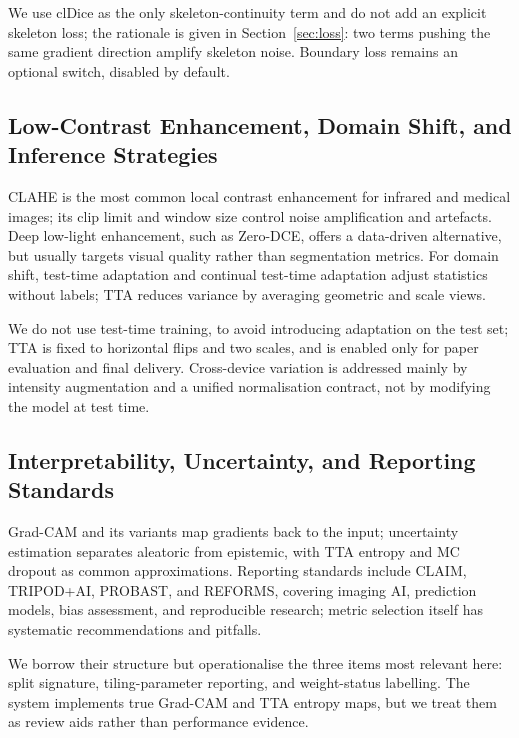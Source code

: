 We use clDice as the only skeleton-continuity term and do not add an explicit skeleton loss; the rationale is given in Section~\ref{sec:loss}: two terms pushing the same gradient direction amplify skeleton noise. Boundary loss remains an optional switch, disabled by default.

\subsection{Low-Contrast Enhancement, Domain Shift, and Inference Strategies}

CLAHE is the most common local contrast enhancement for infrared and medical images; its clip limit and window size control noise amplification and artefacts\cite{infraredclahe}. Deep low-light enhancement, such as Zero-DCE, offers a data-driven alternative\cite{zerodce,lowlightsurvey}, but usually targets visual quality rather than segmentation metrics. For domain shift, test-time adaptation and continual test-time adaptation adjust statistics without labels\cite{tent,cotta}; TTA reduces variance by averaging geometric and scale views\cite{wang2019aleatoric}.

We do not use test-time training, to avoid introducing adaptation on the test set; TTA is fixed to horizontal flips and two scales, and is enabled only for paper evaluation and final delivery. Cross-device variation is addressed mainly by intensity augmentation and a unified normalisation contract, not by modifying the model at test time.

\subsection{Interpretability, Uncertainty, and Reporting Standards}

Grad-CAM and its variants map gradients back to the input\cite{gradcam,gradcampp,scorecam}; uncertainty estimation separates aleatoric from epistemic, with TTA entropy and MC dropout as common approximations\cite{wang2019aleatoric,uncertaintyreview,phiseg}. Reporting standards include CLAIM, TRIPOD+AI, PROBAST, and REFORMS, covering imaging AI, prediction models, bias assessment, and reproducible research\cite{claim2024update,tripodai,probast,reforms}; metric selection itself has systematic recommendations and pitfalls\cite{metricsreloaded,metricpitfalls}.

We borrow their structure but operationalise the three items most relevant here: split signature, tiling-parameter reporting, and weight-status labelling. The system implements true Grad-CAM and TTA entropy maps, but we treat them as review aids rather than performance evidence.
